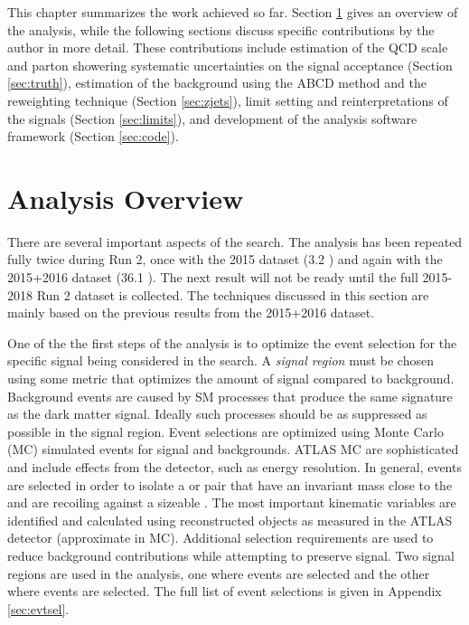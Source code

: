 \label{chapter:prevWork}

This chapter summarizes the work achieved so far. Section \ref{sec:analysis} gives an overview of the analysis, while the following sections discuss specific contributions by the author in more detail. These contributions include estimation of the QCD scale and parton showering systematic uncertainties on the signal acceptance (Section \ref{sec:truth}), estimation of the \Zjets background using the ABCD method and the \gjets reweighting technique (Section \ref{sec:zjets}), limit setting and reinterpretations of the \monoZ signals (Section \ref{sec:limits}), and development of the analysis software framework (Section \ref{sec:code}).

\section{Analysis Overview}
\label{sec:analysis}

There are several important aspects of the \monoZ search. The analysis has been repeated fully twice during Run 2, once with the 2015 dataset (3.2 \ifb) and again with the 2015+2016 dataset (36.1 \ifb). The next result will not be ready until the full 2015-2018 Run 2 dataset is collected. The techniques discussed in this section are mainly based on the previous results from the 2015+2016 dataset. 

One of the the first steps of the analysis is to optimize the event selection for the specific signal being considered in the search. A \textit{signal region} must be chosen using some metric that optimizes the amount of signal compared to background. Background events are caused by SM processes that produce the same signature as the dark matter signal. Ideally such processes should be as suppressed as possible in the signal region. Event selections are optimized using Monte Carlo (MC) simulated events for signal and backgrounds. ATLAS MC are sophisticated and include effects from the detector, such as energy resolution. In general, events are selected in order to isolate a \epem or \mpmm pair that have an invariant mass close to the \Z and are recoiling against a sizeable \etmissvec. The most important kinematic variables are identified and calculated using reconstructed objects as measured in the ATLAS detector (approximate in MC). Additional selection requirements are used to reduce background contributions while attempting to preserve signal. Two signal regions are used in the \monoZ analysis, one where \epem events are selected and the other where \mpmm events are selected. The full list of event selections is given in Appendix \ref{sec:evtsel}.

